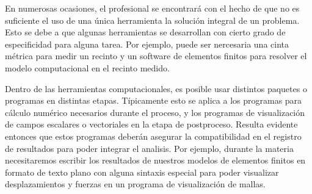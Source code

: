 \newcommand{\userbar}[2]{
\begin{tikzpicture}
  \fill [gray] (0,0) rectangle (1,1.5); 
  \node (#2) [fit={(0,0) (3,1)},text width=\textwidth,align=left] at (1.5,0.5) {\textbf{#1}};
\end{tikzpicture}
}

\newcommand{\pcbar}[4]{
\begin{tikzpicture}
  \fill [Cerulean] (#1,0) rectangle (#2,1.5); 
  \node (#4) [fit={(0,0) (3,1)},text width=\textwidth,align=left] at (1.5,0.5) {\textbf{#3}};
\end{tikzpicture}
}


En numerosas ocasiones, el profesional se encontrará con el 
hecho de que no es suficiente el uso de una única herramienta 
la solución integral de un problema. Esto se debe a que 
algunas herramientas se desarrollan con cierto grado de 
especificidad para alguna tarea. Por ejemplo, puede 
ser nercesaria una cinta métrica para medir un recinto 
y un software de elementos finitos para resolver 
el modelo computacional en el recinto medido. 

Dentro de las herramientas computacionales, es posible
usar distintos paquetes o programas en distintas etapas.
Típicamente esto se aplica a los programas para cálculo
numérico necesarios durante el proceso, y los programas
de visualización de campos escalares o vectoriales en
la etapa de postproceso. Resulta evidente entonces
que estos programas deberán asegurar la compatibilidad
en el registro de resultados para poder integrar 
el analisis. Por ejemplo, durante la materia necesitaremos
escribir los resultados de nuestros modelos de elementos
finitos en formato de texto plano con alguna sintaxis
especial para poder visualizar desplazamientos y 
fuerzas en un programa de visualización de 
mallas. 

\mode*

